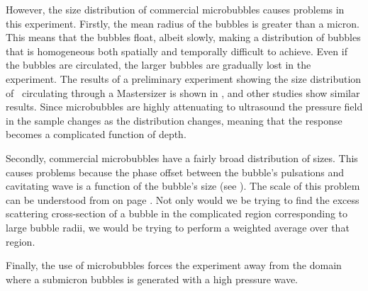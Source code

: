 {  However, the size distribution of commercial microbubbles causes problems in this experiment.
  Firstly, the mean radius of the bubbles is greater than a micron.
  This means that the bubbles float, albeit slowly, making a distribution of bubbles
  that is homogeneous both spatially and temporally difficult to achieve.
  Even if the bubbles are circulated, the larger bubbles are gradually lost in the experiment.
  The results of a preliminary experiment showing the size distribution of \Sonovue\ circulating 
   through a Mastersizer is shown in ,
  and other studies show similar results.
  Since microbubbles are highly attenuating to ultrasound 
  the pressure field in the sample changes as the distribution changes,
  meaning that the response becomes a complicated function of depth.


  Secondly, commercial microbubbles have a fairly broad distribution of sizes.
  This causes problems because the phase offset between the bubble's pulsations and  cavitating wave 
  is a function of the bubble's size (see ).
  The scale of this problem can be understood from  on page \pageref{fig:phase_radial}.
  Not only would we be trying to find the excess scattering cross-section of  a bubble in the complicated region
  corresponding to large bubble radii, we would be trying to perform a weighted average over that region.

Finally, the use of microbubbles forces the experiment away from the domain where a submicron bubbles is generated  with a high pressure wave.
  




}
